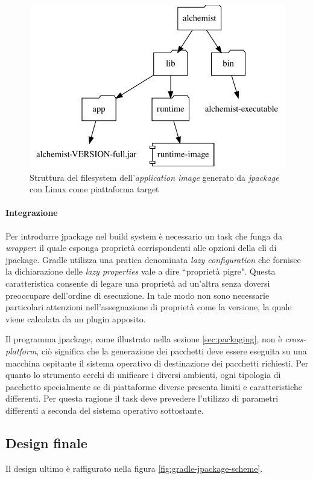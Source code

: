 \begin{figure}
	\centering
	\includegraphics[width=.7\linewidth]{figures/application-image-folder-structure.pdf}
	\caption{Struttura del filesystem dell'\textit{application image} generato da \textit{jpackage} con Linux come piattaforma target}
	\label{fig:application-image-folder-structure}
\end{figure}

\paragraph{Integrazione} Per introdurre jpackage nel build system è necessario un task che funga da \textit{wrapper}: il quale esponga proprietà corrispondenti alle opzioni della \ac{cli} di jpackage. Gradle utilizza una pratica denominata \textit{lazy configuration} che fornisce la dichiarazione delle \textit{lazy properties} vale a dire ``proprietà pigre". Questa caratteristica consente di legare una proprietà ad un'altra senza doversi preoccupare dell'ordine di esecuzione. In tale modo non sono necessarie particolari attenzioni nell'assegnazione di proprietà come la versione, la quale viene calcolata da un plugin apposito. 

Il programma jpackage, come illustrato nella sezione \ref{sec:packaging}, non è \textit{cross-platform}, ciò significa che la generazione dei pacchetti deve essere eseguita su una macchina ospitante il sistema operativo di destinazione dei pacchetti richiesti. Per quanto lo strumento cerchi di unificare i diversi ambienti, ogni tipologia di pacchetto specialmente se di piattaforme diverse presenta limiti e caratteristiche differenti. Per questa ragione il task deve prevedere l'utilizzo di parametri differenti a seconda del sistema operativo sottostante.

\subsection{Design finale} Il design ultimo è raffigurato nella figura \ref{fig:gradle-jpackage-scheme}. 

